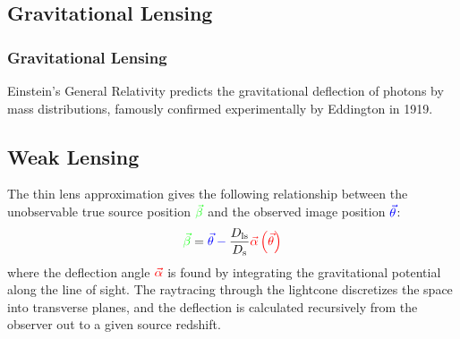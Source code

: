 \documentclass{beamer}
\begin{document}
  \subsection{Gravitational Lensing}

  \begin{frame}
    \frametitle{\sc Gravitational Lensing}
    Einstein's General Relativity predicts the gravitational deflection of photons by mass distributions, famously confirmed experimentally by Eddington in 1919.
    \\
    \centering
  \end{frame}

  \subsection{Weak Lensing}

  \begin{frame}
    The thin lens approximation gives the following relationship between the unobservable true source position $\color{green}{\vec{\beta}}$ and the observed image position $\color{blue}{\vec{\theta}}$:
    \begin{equation} \label{eq:lens}
      \color{green}{\vec{\beta}} \color{black}= \color{blue}{\vec{\theta}} - \color{black}{\frac{D_{\text{ls}}}{D_{\text{s}}}}\color{red}{\vec{\alpha}}\left( \vec{\theta} \right)\color{black}
    \end{equation}
    where the deflection angle $\color{red}{\vec{\alpha}}$ is found by integrating the gravitational potential along the line of sight. The raytracing through the lightcone discretizes the space into transverse planes, and the deflection is calculated recursively from the observer out to a given source redshift.
  \end{frame}
\end{document}
